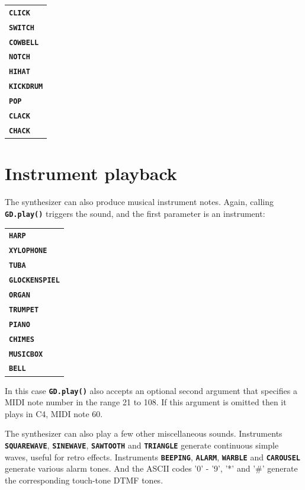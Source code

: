 \documentclass[10pt]{book}
\newcommand{\mach}[1]{\texttt{\textbf{#1}}}
\begin{document}
\begin{CJK}{UTF8}{gkai}
\vspace{10pt}
\begin{tabular}{l}
\mach{CLICK} \\
\mach{SWITCH} \\
\mach{COWBELL} \\
\mach{NOTCH} \\
\mach{HIHAT} \\
\mach{KICKDRUM} \\
\mach{POP} \\
\mach{CLACK} \\
\mach{CHACK} \\
\end{tabular}
\vspace{10pt}

\section{Instrument playback}

The synthesizer can also produce musical instrument notes.
Again, calling \mach{GD.play()} triggers the sound, and the first parameter
is an instrument:

\label{instruments}

\vspace{10pt}
\begin{tabular}{l}
\mach{HARP} \\
\mach{XYLOPHONE} \\
\mach{TUBA} \\
\mach{GLOCKENSPIEL} \\
\mach{ORGAN} \\
\mach{TRUMPET} \\
\mach{PIANO} \\
\mach{CHIMES} \\
\mach{MUSICBOX} \\
\mach{BELL}
\end{tabular}
\vspace{10pt}

\noindent
In this case \mach{GD.play()} also accepts an optional second argument that specifies a MIDI note number 
in the range 21 to 108. If this argument is omitted then it plays in C4, MIDI note 60.

The synthesizer can also play a few other miscellaneous sounds.
Instruments
\mach{SQUAREWAVE},
\mach{SINEWAVE},
\mach{SAWTOOTH} and
\mach{TRIANGLE}
generate continuous simple waves, useful for retro effects.
Instruments
\mach{BEEPING},
\mach{ALARM},
\mach{WARBLE} and
\mach{CAROUSEL}
generate various alarm tones.
And the ASCII codes '0' - '9', '*' and '\#' generate the corresponding touch-tone DTMF tones.


\end{CJK}
\end{document}
